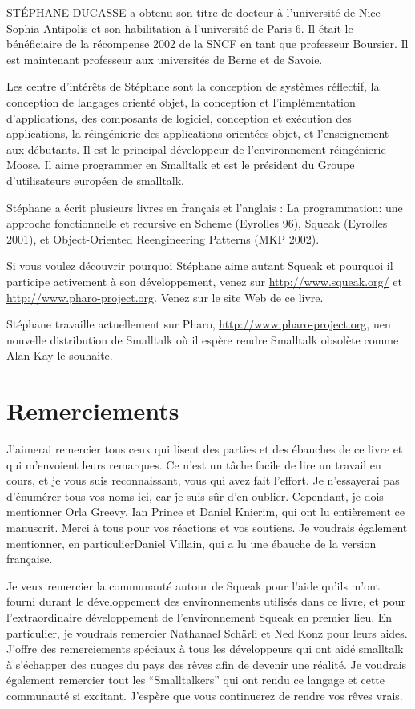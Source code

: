 \documentclass[a4paper,10pt,twoside]{book}
\begin{document}
ST\'EPHANE DUCASSE a obtenu son titre de docteur \`a l'universit\'e de Nice-Sophia Antipolis et son habilitation \`a l'universit\'e de Paris 6. Il \'etait le b\'en\'eficiaire de la r\'ecompense 2002 de la SNCF en tant que professeur Boursier. Il est maintenant professeur aux universit\'es de Berne et de Savoie.

Les centre d'int\'er\^ets de St\'ephane sont la conception de syst\`emes r\'eflectif, la conception de langages orient\'e objet, la conception et l'impl\'ementation d'applications,  des composants de logiciel, conception et ex\'ecution des applications, la r\'eing\'enierie des applications orient\'ees objet, et l'enseignement aux d\'ebutants. Il est le principal d\'eveloppeur de l'environnement r\'eing\'enierie Moose. Il aime programmer en Smalltalk et est le pr\'esident du Groupe d'utilisateurs europ\'een de smalltalk.

St\'ephane a \'ecrit plusieurs livres en fran\c cais et l'anglais : La programmation: une approche fonctionnelle et recursive en Scheme (Eyrolles 96), Squeak (Eyrolles 2001), et Object-Oriented Reengineering Patterns (MKP 2002).

Si vous voulez d\'ecouvrir pourquoi St\'ephane aime autant Squeak et pourquoi il participe activement \`a son d\'eveloppement, venez sur  \url{http://www.squeak.org/} et \url{http://www.pharo-project.org}. Venez sur  le site Web de ce livre.

St\'ephane travaille actuellement sur Pharo, \url{http://www.pharo-project.org},  uen nouvelle distribution de Smalltalk o\`u il esp\`ere rendre Smalltalk obsol\`ete comme Alan Kay le souhaite. 

\chapter*{Remerciements}
J'aimerai remercier tous ceux qui lisent des parties et des \'ebauches de ce livre et qui m'envoient leurs remarques. Ce n'est un t\^ache facile de lire un travail en cours, et je vous suis reconnaissant,  vous qui avez fait l'effort. Je n'essayerai pas d'\'enum\'erer tous vos noms ici, car je suis s\^ur d'en oublier. Cependant, je dois mentionner Orla Greevy, Ian Prince et Daniel Knierim, qui ont lu enti\`erement ce manuscrit. Merci \`a tous pour vos r\'eactions et vos soutiens. Je voudrais \'egalement mentionner, en particulierDaniel Villain, qui a lu une \'ebauche de la version fran\c caise.


Je veux remercier la communaut\'e autour de Squeak pour l'aide qu'ils m'ont fourni durant le d\'eveloppement des environnements utilis\'es dans ce livre, et pour l'extraordinaire d\'eveloppement de  l'environnement Squeak en premier lieu. En particulier, je voudrais remercier Nathanael Sch\"arli et Ned Konz pour leurs aides. J'offre des remerciements sp\'eciaux \`a tous les d\'eveloppeurs qui ont aid\'e smalltalk \`a s'\'echapper des nuages du pays des r\^eves afin de devenir une r\'ealit\'e. Je voudrais \'egalement remercier tout les ``Smalltalkers'' qui ont rendu ce langage et cette communaut\'e si excitant. J'esp\`ere que vous continuerez de rendre vos r\^eves vrais.
\end{document}
